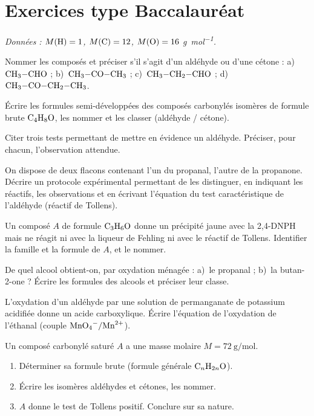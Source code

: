 \section{Exercices type Baccalauréat}
\textit{Données : $M(\ce{H})=1$, $M(\ce{C})=12$, $M(\ce{O})=16$ \si{\gram\per\mol}.}


\exo{} Nommer les composés et préciser s'il s'agit d'un aldéhyde ou d'une
cétone : a)~$\ce{CH3-CHO}$ ; b)~$\ce{CH3-CO-CH3}$ ; c)~$\ce{CH3-CH2-CHO}$ ;
d)~$\ce{CH3-CO-CH2-CH3}$.

\exo{} Écrire les formules semi-développées des composés carbonylés isomères
de formule brute $\ce{C4H8O}$, les nommer et les classer (aldéhyde / cétone).


\exo{} Citer trois tests permettant de mettre en évidence un aldéhyde.
Préciser, pour chacun, l'observation attendue.

\exo{} On dispose de deux flacons contenant l'un du propanal, l'autre de la
propanone. Décrire un protocole expérimental permettant de les distinguer, en
indiquant les réactifs, les observations et en écrivant l'équation du test
caractéristique de l'aldéhyde (réactif de Tollens).

\exo{} Un composé $A$ de formule $\ce{C3H6O}$ donne un précipité jaune avec
la 2,4-DNPH mais ne réagit ni avec la liqueur de Fehling ni avec le réactif de
Tollens. Identifier la famille et la formule de $A$, et le nommer.


\exo{} De quel alcool obtient-on, par oxydation ménagée : a)~le propanal ;
b)~la butan-2-one ? Écrire les formules des alcools et préciser leur classe.

\exo{} L'oxydation d'un aldéhyde par une solution de permanganate de
potassium acidifiée donne un acide carboxylique. Écrire l'équation de l'oxydation de
l'éthanal (couple $\ce{MnO4-}/\ce{Mn^2+}$).


\exo{} Un composé carbonylé saturé $A$ a une masse molaire
$M = \SI{72}{\gram\per\mol}$.
\begin{enumerate}[label=\arabic*)]
\item Déterminer sa formule brute (formule générale $\ce{C_nH_{2n}O}$).
\item Écrire les isomères aldéhydes et cétones, les nommer.
\item $A$ donne le test de Tollens positif. Conclure sur sa nature.
\end{enumerate}

